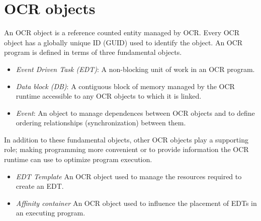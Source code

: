 %

\section{OCR objects}
\label{sec:OCRobjects}


An OCR object is a reference counted entity managed by OCR. Every OCR
object has a globally unique ID (GUID) used to identify the
object. An OCR program is defined in terms of three fundamental objects.
\begin{itemize}
\item \emph{Event Driven Task (EDT)}: A non-blocking unit of work in an OCR
program.
\item\emph{Data block (DB)}: A contiguous block of memory managed by the
OCR runtime accessible to any OCR objects to which it is linked.
\item\emph{Event}: An object to manage dependences between OCR objects and
to define ordering relationships (synchronization) between them.
\end{itemize}

In addition to these fundamental objects, other OCR objects
play a supporting role; making programming more convenient or
to provide information the OCR runtime can use to optimize program execution.
\begin{itemize}
\item \emph{EDT Template} An OCR object used to manage the resources
required to create an EDT.
\item \emph{Affinity container} An OCR object used to influence the
placement of EDTs in an executing program.
\end{itemize}


